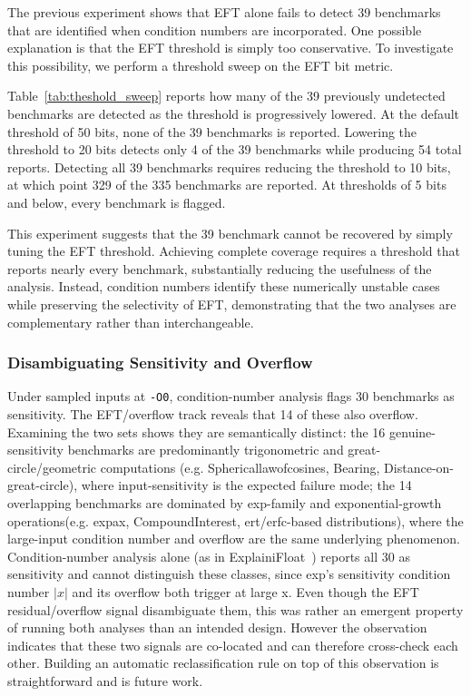 The previous experiment shows that EFT alone fails to detect 39 benchmarks that are identified when condition numbers are incorporated. One possible explanation is that the EFT threshold is simply too conservative. To investigate this possibility, we perform a threshold sweep on the EFT bit metric.



Table~\ref{tab:theshold_sweep} reports how many of the 39 previously undetected benchmarks are detected as the threshold is progressively lowered. At the default threshold of 50 bits, none of the 39 benchmarks is reported. Lowering the threshold to 20 bits detects only 4 of the 39 benchmarks while producing 54 total reports. Detecting all 39 benchmarks requires reducing the threshold to 10 bits, at which point 329 of the 335 benchmarks are reported. At thresholds of 5 bits and below, every benchmark is flagged.

This experiment suggests that the 39 benchmark cannot be recovered by simply tuning the EFT threshold. Achieving complete coverage requires a threshold that reports nearly every benchmark, substantially reducing the usefulness of the analysis. Instead, condition numbers identify these numerically unstable cases while preserving the selectivity of EFT, demonstrating that the two analyses are complementary rather than interchangeable.

\subsubsection{Disambiguating Sensitivity and Overflow}
\label{sec:disambiguate}
Under sampled inputs at \texttt{-O0}, condition-number analysis flags 30 benchmarks as sensitivity. The EFT/overflow track reveals that 14 of these also overflow. Examining the two sets shows they are semantically distinct: the 16 genuine-sensitivity benchmarks are predominantly trigonometric and great-circle/geometric computations (e.g. Sphericallawofcosines, Bearing, Distance-on-great-circle), where input-sensitivity is the expected failure mode; the 14 overlapping benchmarks are dominated by exp-family and exponential-growth operations(e.g. expax, CompoundInterest, ert/erfc-based distributions), where the large-input condition number and overflow are the same underlying phenomenon. Condition-number analysis alone (as in ExplainiFloat~\cite{explainifloat}) reports all 30 as sensitivity and cannot distinguish these classes, since exp's sensitivity condition number $\lvert x \rvert$ and its overflow both trigger at large x. Even though the EFT residual/overflow signal disambiguate them, this was rather an emergent property of running both analyses than an intended design. However the observation indicates that these two signals are co-located and can therefore cross-check each other. Building an automatic reclassification rule on top of this observation is straightforward and is future work.

